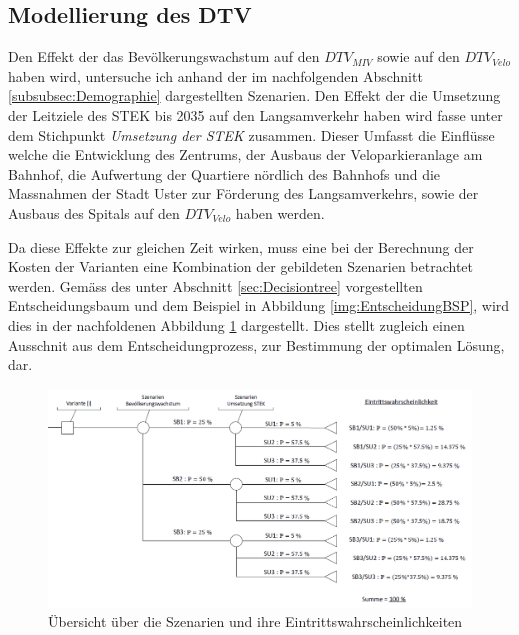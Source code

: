 	\subsection{Modellierung des DTV}
	\label{subsec:Modellierung}
	
Den Effekt der das Bevölkerungswachstum auf den $DTV_{MIV}$ sowie auf den $DTV_{Velo}$ haben wird, untersuche ich anhand der im nachfolgenden Abschnitt \ref{subsubsec:Demographie} dargestellten Szenarien. Den Effekt der die Umsetzung der Leitziele des STEK bis 2035 auf den Langsamverkehr haben wird fasse unter dem Stichpunkt \textit{Umsetzung der STEK} zusammen. Dieser Umfasst die Einflüsse welche die Entwicklung des Zentrums, der Ausbaus der Veloparkieranlage am Bahnhof, die Aufwertung der Quartiere nördlich des Bahnhofs und die Massnahmen der Stadt Uster zur Förderung des Langsamverkehrs, sowie der Ausbaus des Spitals auf den $DTV_{Velo}$ haben werden.

Da diese Effekte zur gleichen Zeit wirken, muss eine bei der Berechnung der Kosten der Varianten eine Kombination der gebildeten Szenarien betrachtet werden. Gemäss des unter Abschnitt \ref{sec:Decisiontree} vorgestellten Entscheidungsbaum und dem Beispiel in Abbildung \ref{img:EntscheidungBSP}, wird dies in der nachfoldenen Abbildung \ref{img:EntscheidunSzenarien} dargestellt. Dies stellt zugleich einen Ausschnit aus dem Entscheidungprozess, zur Bestimmung der optimalen Lösung, dar.

\begin{figure}[h!]
	\centering
	\includegraphics[width=\textwidth]{figures/04-06-01-Entscheidungsbaum-Szenarien}
	\caption[Szenarienübersicht]{Übersicht über die Szenarien und ihre Eintrittswahrscheinlichkeiten}
	\label{img:EntscheidunSzenarien}
\end{figure}

	


